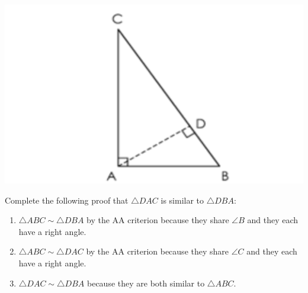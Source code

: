 \documentclass[nooutcomes]{ximera}
\begin{document}
\begin{problem}
\begin{image}
\includegraphics{Q17.png}
\end{image}
Complete the following proof that $\triangle DAC$ is similar to $\triangle DBA$: 

\begin{enumerate}
\item $\triangle ABC\sim \triangle DBA$ by the AA criterion because they share $\angle B$ and they each have a right angle. 

\item $\triangle ABC\sim \triangle DAC$ by the AA criterion because they share $\angle C$ and they each have a right angle. 

\item $\triangle DAC\sim \triangle DBA$ because they are both similar to
$\triangle ABC$.
\end{enumerate}
\end{problem}
\end{document}
